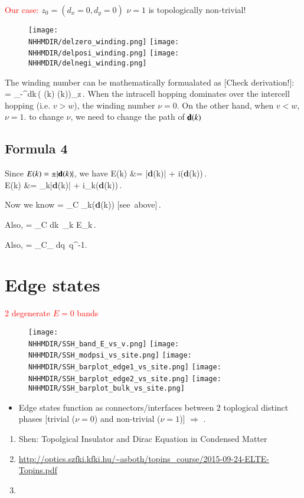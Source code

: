 \documentclass[aps,prb,epsf,epsfig,floatfix,showpacs,groupedaddres,superscriptaddress]{revtex4-1}
\numberwithin{equation}{section}
\def\NHHMDIR{/Users/dirac/Documents/My_Talks/FIGS_NHHM}
\def\blgn#1\elgn{\begin{align}#1\end{align}}
\newcommand{\f}{\frac}
\def\h{\hat}
\newcommand{\dv}{{\bf d}}
\newcommand{\pd}{{\partial}}
\newcommand{\pdk}{{\partial_k}}
\newcommand{\finvtwpi}{\f{1}{2\pi}}
\def\non{\nonumber}
\newcommand{\inv}{{^{-1}}}
\def\pd{\partial}
\def\bi{\begin{itemize}}
\def\ei{\end{itemize}}
\def\i{\item}
\newcommand{\bnu}{\begin{enumerate}}
\newcommand{\enu}{\end{enumerate}}
\def\Ra{\Rightarrow}
\def\alert#1{\textcolor{red}{#1}}  %
\begin{document}
\alert{Our case:}
 $z_0 = (d_x=0,d_y=0)$ $\nu=1$ is {\blue topologically non-trivial!}
\begin{figure}
	\texttt{[image: \\NHHMDIR/delzero\_winding.png]}
	\texttt{[image: \\NHHMDIR/delposi\_winding.png]}
	\texttt{[image: \\NHHMDIR/delnegi\_winding.png]}
\end{figure}

The winding number can be mathematically formualated as
[{\red Check derivation!}]:
\blgn
\nu = \f{1}{2\pi} \int_{-\pi}^{\pi}dk\,\bigg( \h {\bf d}(k)\times \f{d}{dk}  \h {\bf d}(k)\bigg)_z\,.
\elgn
When the intracell hopping dominates over the intercell hopping (i.e. $v > w$), the winding number 
$\nu = 0$. On the other hand, when $v < w $, $\nu = 1$. to change $\nu$, we need to change the path 
of $\dv(k)$

\subsection*{Formula 4}
Since $E(k)=\pm|\dv(k)|$, we have
\blgn
 \ln E(k) &= \ln |\dv(k)| + i\arg(\dv(k))\,.\non\\
 \Ra \pdk \ln E(k) &= \pdk\ln |\dv(k)| + i\pdk\arg(\dv(k))\,.
\elgn

Now we know
\blgn
\nu = \finvtwpi \oint_C \pdk\arg(\dv(k)) \quad\mbox{[see above]}\,.  
\elgn

Also,
\blgn
\nu = \f{1}{2\pi i} \oint_C dk\, \pd_k \ln E_k\,. 
\elgn

Also,
\blgn
\nu = \f{i}{2\pi} \int_{C_\beta} dq\, q\inv. 
\elgn
 

\section{Edge states}
\alert{2 degenerate $E=0$ bands} 
\begin{figure}
	\texttt{[image: \\NHHMDIR/SSH\_band\_E\_vs\_v.png]}
	\texttt{[image: \\NHHMDIR/SSH\_modpsi\_vs\_site.png]}
	\texttt{[image: \\NHHMDIR/SSH\_barplot\_edge1\_vs\_site.png]}
	\texttt{[image: \\NHHMDIR/SSH\_barplot\_edge2\_vs\_site.png]}
	\texttt{[image: \\NHHMDIR/SSH\_barplot\_bulk\_vs\_site.png]}
\end{figure}
\bi
\i Edge states function as connectors/interfaces between 2 toplogical distinct phases
[trivial ($\nu=0$) and non-trivial ($\nu=1$)] $\Ra$ .
\ei

\bnu
 \i Shen: Topolgical Insulator and Dirac Equation in Condensed Matter
\i \url{http://optics.szfki.kfki.hu/~asboth/topins_course/2015-09-24-ELTE-Topins.pdf}
\i %
 \enu
\end{document}

